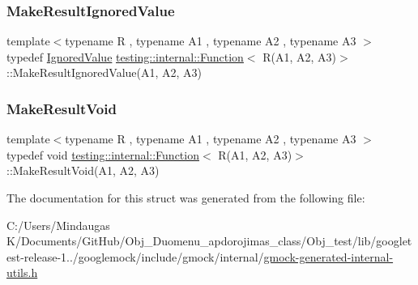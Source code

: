 \mbox{\label{structtesting_1_1internal_1_1_function_3_01_r_07_a1_00_01_a2_00_01_a3_08_4_abff7468ae8231766e7b396c8a407cb5a}} 
\subsubsection{\texorpdfstring{MakeResultIgnoredValue}{MakeResultIgnoredValue}}
{\footnotesize\ttfamily template$<$typename R , typename A1 , typename A2 , typename A3 $>$ \\
typedef \mbox{\hyperlink{classtesting_1_1internal_1_1_ignored_value}{Ignored\+Value}} \mbox{\hyperlink{structtesting_1_1internal_1_1_function}{testing\+::internal\+::\+Function}}$<$ R(A1, A2, A3)$>$\+::Make\+Result\+Ignored\+Value(A1, A2, A3)}

\mbox{\label{structtesting_1_1internal_1_1_function_3_01_r_07_a1_00_01_a2_00_01_a3_08_4_a6b9f583a9ef6755cc92ce2b7fa255b84}} 
\subsubsection{\texorpdfstring{MakeResultVoid}{MakeResultVoid}}
{\footnotesize\ttfamily template$<$typename R , typename A1 , typename A2 , typename A3 $>$ \\
typedef void \mbox{\hyperlink{structtesting_1_1internal_1_1_function}{testing\+::internal\+::\+Function}}$<$ R(A1, A2, A3)$>$\+::Make\+Result\+Void(A1, A2, A3)}



The documentation for this struct was generated from the following file\+:\begin{DoxyCompactItemize}
\item 
C\+:/\+Users/\+Mindaugas K/\+Documents/\+Git\+Hub/\+Obj\+\_\+\+Duomenu\+\_\+apdorojimas\+\_\+class/\+Obj\+\_\+test/lib/googletest-\/release-\/1../googlemock/include/gmock/internal/\mbox{\hyperlink{gmock-generated-internal-utils_8h}{gmock-\/generated-\/internal-\/utils.\+h}}\end{DoxyCompactItemize}
